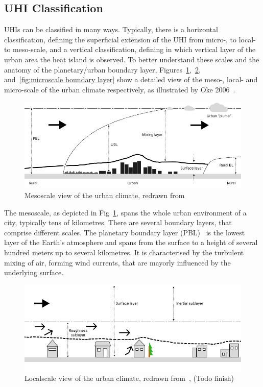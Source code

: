 \subsection{UHI Classification}

UHIs can be classified in many ways. Typically, there is a horizontal classification, defining the superficial extension of the UHI from micro-, to local- to meso-scale, and a vertical classification, defining in which vertical layer of the urban area the heat island is observed. To better understand these scales and the anatomy of the planetary/urban boundary layer, Figures~\ref{fig:mesoscale boundary layer},~\ref{fig:localscale boundary layer}, and~\ref{fig:microscale boundary layer} show a detailed view of the meso-, local- and micro-scale of the urban climate respectively, as illustrated by Oke 2006~\cite{oke2006guideline}.

\begin{figure}[h]
    \centering
    \includegraphics[width=\textwidth]{images/Mesoscale Boundary Layer.png}
    \caption{Mesoscale view of the urban climate, redrawn from~\cite{oke2006guideline}}
    \label{fig:mesoscale boundary layer}
\end{figure}

The mesoscale, as depicted in Fig~\ref{fig:mesoscale boundary layer}, spans the whole urban environment of a city, typically tens of kilometres. There are several boundary layers, that comprise different scales. The planetary boundary layer (PBL)~\cite{wyngaard1985structure} is the lowest layer of the Earth's atmosphere and spans from the surface to a height of several hundred meters up to several kilometres. It is characterised by the turbulent mixing of air, forming wind currents, that are mayorly influenced by the underlying surface.

\begin{figure}[h]
    \centering
    \includegraphics[width=\textwidth]{images/Localscale Boundary Layer.png}
    \caption{Localscale view of the urban climate, redrawn from~\cite{oke2006guideline}, (Todo finish)}
    \label{fig:localscale boundary layer}
\end{figure}

